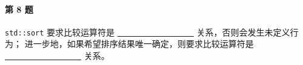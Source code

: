 \paragraph{第 8 题} \lstinline{std::sort} 要求比较运算符是
\underline{\quad~~~~~~~~~~~~~~~~~~} 关系，否则会发生未定义行为；
进一步地，如果希望排序结果唯一确定，则要求比较运算符是
\underline{\quad~~~~~~~~~~~~~~~~~~} 关系。

